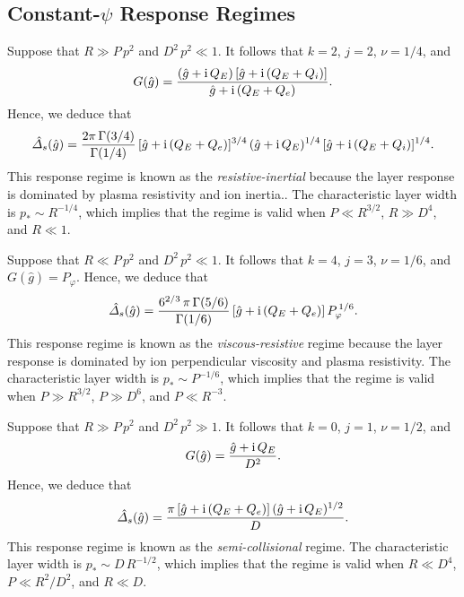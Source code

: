 \documentclass[12pt,prb,aps]{revtex4-1}
\begin{document}
\subsection{Constant-$\psi$ Response Regimes}\label{scp}
Suppose that $R\gg P\,p^2$ and $D^2\,p^2 \ll 1$. It follows that $k=2$, $j=2$, $\nu=1/4$, and
\begin{equation}
G(\hat{g}) = \frac{(\hat{g}+{\rm i}\,Q_E)\,[\hat{g}+{\rm i}\,(Q_E+Q_i)]}{\hat{g}+{\rm i}\,(Q_E+Q_e)}.
\end{equation}
Hence, we deduce that
\begin{equation}\label{ri}
\hat{\mit\Delta}_s(\hat{g}) = \frac{2\pi\,\Gamma(3/4)}{\Gamma(1/4)}\,[\hat{g}+{\rm i}\,(Q_E+Q_e)]^{3/4}\,(\hat{g}
+{\rm i}\,Q_E)^{1/4}\,[\hat{g}+{\rm i}\,(Q_E+Q_i)]^{1/4}.
\end{equation}
This response regime is known as the {\em resistive-inertial}\/  because the layer response is dominated by
plasma resistivity and ion inertia.\cite{fkr,err1a,ara}. The characteristic layer width is $p_\ast \sim R^{-1/4}$,
which implies that the regime is valid when $P\ll R^{3/2}$, $R\gg D^4$, and $R\ll 1$. 

Suppose that $R\ll P\,p^2$ and $D^2\,p^2\ll 1$. It follows that $k=4$, $j=3$, $\nu=1/6$, and $G(\hat{g})=P_\varphi$. 
Hence, we deduce that
\begin{equation}\label{vr}
\hat{\mit\Delta}_s(\hat{g}) = \frac{6^{2/3}\,\pi\,\Gamma(5/6)}{\Gamma(1/6)}\, [\hat{g}+{\rm i}\,(Q_E+Q_e)]\,P_\varphi^{\,1/6}.
\end{equation}
This response regime is known as the {\em viscous-resistive}\/ regime because the layer response is dominated by
  ion perpendicular viscosity and plasma resistivity.\cite{err1,bond} The characteristic layer width is $p_\ast \sim P^{-1/6}$, which implies that
the regime is valid when  $P\gg R^{3/2}$, $P\gg D^6$, and $P\ll R^{-3}$. 

Suppose that $R\gg P\,p^2$ and $D^2\,p^2\gg 1$. It follows that $k=0$, $j=1$, $\nu=1/2$, and
\begin{equation}
G(\hat{g}) = \frac{\hat{g}+ {\rm i}\,Q_E}{D^2}.
\end{equation}
Hence, we deduce that
\begin{equation}\label{sc}
\hat{\mit\Delta}_s(\hat{g})= \frac{\pi\,[\hat{g}+{\rm i}\,(Q_E+Q_e)]\,(\hat{g}+{\rm i}\,Q_E)^{1/2}}{D}.
\end{equation}
This response regime is known as the {\em semi-collisional}\/ regime.\cite{drake,wal} The characteristic
layer width is $p_\ast\sim D\,R^{-1/2}$, which implies that the regime is valid when $R\ll D^4$,
 $P\ll R^2/D^2$, and $R\ll D$. 
 
\end{document}
